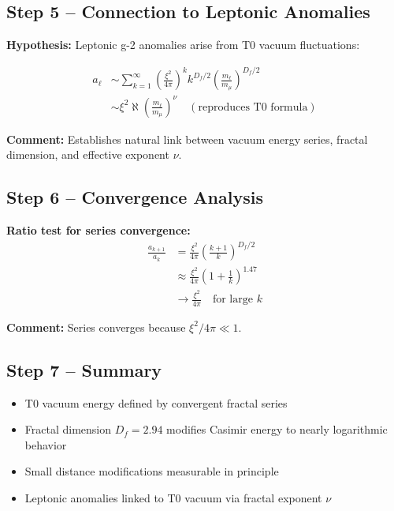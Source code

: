 \documentclass[12pt,a4paper]{article}
\newcommand{\xipar}{\xi}            %
\newcommand{\nulep}{\nu}            %
\begin{document}
\subsection{Step 5 – Connection to Leptonic Anomalies}

\textbf{Hypothesis:} Leptonic g-2 anomalies arise from T0 vacuum fluctuations:

\begin{align}
	a_\ell &\sim \sum_{k=1}^\infty \left(\frac{\xi^2}{4\pi}\right)^k k^{D_f/2} \left(\frac{m_\ell}{m_\mu}\right)^{D_f/2} \\
	&\sim \xipar^2 \aleph \left(\frac{m_\ell}{m_\mu}\right)^{\nulep} \quad (\text{reproduces T0 formula})
\end{align}

\textbf{Comment:} Establishes natural link between vacuum energy series, fractal dimension, and effective exponent $\nulep$.

\subsection{Step 6 – Convergence Analysis}

\textbf{Ratio test for series convergence:}
\begin{align}
	\frac{a_{k+1}}{a_k} &= \frac{\xi^2}{4\pi} \left(\frac{k+1}{k}\right)^{D_f/2} \\
	&\approx \frac{\xi^2}{4\pi} \left(1 + \frac{1}{k}\right)^{1.47} \\
	&\rightarrow \frac{\xi^2}{4\pi} \quad \text{for large } k
\end{align}

\textbf{Comment:} Series converges because $\xi^2 / 4\pi \ll 1$.

\subsection{Step 7 – Summary}

\begin{itemize}
	\item T0 vacuum energy defined by convergent fractal series
	\item Fractal dimension $D_f = 2.94$ modifies Casimir energy to nearly logarithmic behavior
	\item Small distance modifications measurable in principle
	\item Leptonic anomalies linked to T0 vacuum via fractal exponent $\nulep$
\end{itemize}
\end{document}
